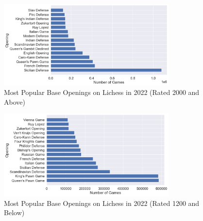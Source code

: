 \documentclass[a4paper, 11pt]{article}
\begin{document}
\begin{appendices}
\begin{figure}[H]
    \centering
    \caption{Most Popular Base Openings on Lichess in 2022 (Rated 2000 and Above)}
    \label{fig:mostPopularOpeningsRated2000Plus}
    \includegraphics[width=0.8\textwidth]{Most Popular Base Openings (Rated 2000+).png}
\end{figure}

\begin{figure}[H]
    \centering
    \caption{Most Popular Base Openings on Lichess in 2022 (Rated 1200 and Below)}
    \label{fig:mostPopularOpeningsRated1200Minus}
    \includegraphics[width=0.8\textwidth]{Most Popular Base Openings (Rated 1200-).png}
\end{figure}


\end{appendices}
\end{document}
